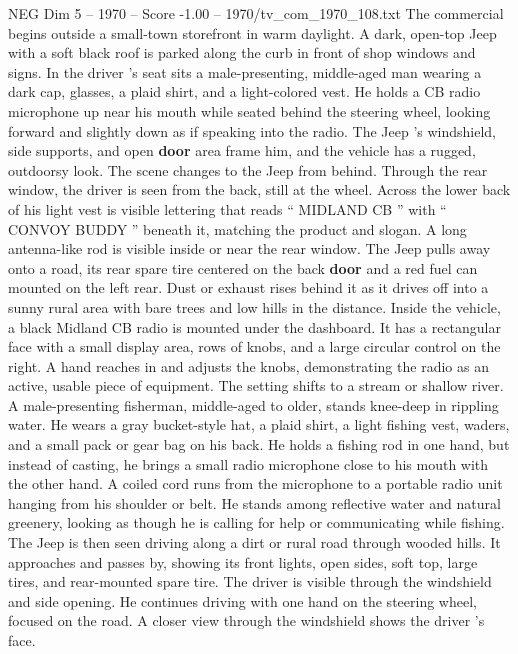 \begin{textsample}{NEG Dim 5 – 1970 – Score -1.00 – 1970/tv\_com\_1970\_108.txt}  \label{ex:f5_neg_004}
The commercial begins outside a small-town storefront in warm daylight.
A dark, open-top Jeep with a soft black roof is parked along the curb in front of shop windows and signs.
In the driver ’s seat sits a male-presenting, middle-aged man wearing a dark cap, glasses, a plaid shirt, and a light-colored vest.
He holds a CB radio microphone up near his mouth while seated behind the steering wheel, looking forward and slightly down as if speaking into the radio.
The Jeep ’s windshield, side supports, and open \textbf{door} area frame him, and the vehicle has a rugged, outdoorsy look.
The scene changes to the Jeep from behind.
Through the rear window, the driver is seen from the back, still at the wheel.
Across the lower back of his light vest is visible lettering that reads “ MIDLAND CB ” with “ CONVOY BUDDY ” beneath it, matching the product and slogan.
A long antenna-like rod is visible inside or near the rear window.
The Jeep pulls away onto a road, its rear spare tire centered on the back \textbf{door} and a red fuel can mounted on the left rear.
Dust or exhaust rises behind it as it drives off into a sunny rural area with bare trees and low hills in the distance.
Inside the vehicle, a black Midland CB radio is mounted under the dashboard.
It has a rectangular face with a small display area, rows of knobs, and a large circular control on the right.
A hand reaches in and adjusts the knobs, demonstrating the radio as an active, usable piece of equipment.
The setting shifts to a stream or shallow river.
A male-presenting fisherman, middle-aged to older, stands knee-deep in rippling water.
He wears a gray bucket-style hat, a plaid shirt, a light fishing vest, waders, and a small pack or gear bag on his back.
He holds a fishing rod in one hand, but instead of casting, he brings a small radio microphone close to his mouth with the other hand.
A coiled cord runs from the microphone to a portable radio unit hanging from his shoulder or belt.
He stands among reflective water and natural greenery, looking as though he is calling for help or communicating while fishing.
The Jeep is then seen driving along a dirt or rural road through wooded hills.
It approaches and passes by, showing its front lights, open sides, soft top, large tires, and rear-mounted spare tire.
The driver is visible through the windshield and side opening.
He continues driving with one hand on the steering wheel, focused on the road.
A closer view through the windshield shows the driver ’s face.

\end{textsample}
